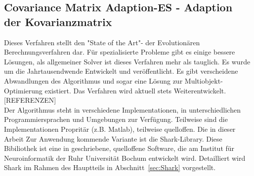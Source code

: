 \subsection{Covariance Matrix Adaption-ES - Adaption der Kovarianzmatrix}
%
Dieses Verfahren stellt den "State of the Art"- der Evolutionären Berechnungsverfahren dar. Für spezialisierte Probleme gibt es einige bessere Lösungen, als allgemeiner Solver ist dieses Verfahren mehr als tauglich. Es wurde um die Jahrtausendwende Entwickelt und veröffentlicht. Es gibt verscheidene Abwandlungen des Algorithmus und sogar eine Lösung zur Multiobjekt-Optimierung existiert. Das Verfahren wird aktuell stets Weiterentwickelt. [REFERENZEN]\\
Der Algorithmus steht in verschiedene Implementationen, in unterschiedlichen Programmiersprachen und Umgebungen zur Verfügung. Teilweise sind die Implementationen Propritär (z.B. Matlab), teilweise quelloffen. Die in dieser Arbeit Zur Anwendung kommende Variante ist die Shark-Library. Diese Bibiliothek ist eine in \cpp geschriebene, quelloffene Software, die am Institut für Neuroinformatik der Ruhr Universität Bochum entwickelt wird. Detailliert wird Shark im Rahmen des Hauptteils in Abschnitt~\ref{sec:Shark} vorgestellt.\\
%
